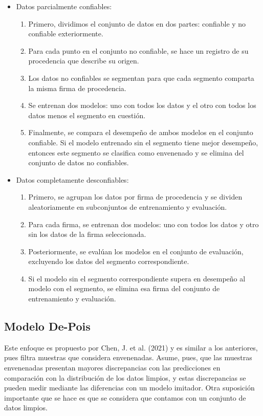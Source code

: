 \documentclass[letterpaper,12pt,oneside]{book}
\begin{document}
{{{{\begin{itemize}
    \item Datos parcialmente confiables:
    \begin{enumerate}
        \item Primero, dividimos el conjunto de datos en dos partes: confiable y no confiable exteriormente.
        \item Para cada punto en el conjunto no confiable, se hace un registro de su procedencia que describe su origen.
        \item Los datos no confiables se segmentan para que cada segmento comparta la misma firma de procedencia.
        \item Se entrenan dos modelos: uno con todos los datos y el otro con todos los datos menos el segmento en cuestión.
        \item Finalmente, se compara el desempeño de ambos modelos en el conjunto confiable. Si el modelo entrenado sin el segmento tiene mejor desempeño, entonces este segmento se clasifica como envenenado y se elimina del conjunto de datos no confiables.
    \end{enumerate}
    
    \item Datos completamente desconfiables:
    \begin{enumerate}
        \item Primero, se agrupan los datos por firma de procedencia y se dividen aleatoriamente en subconjuntos de entrenamiento y evaluación.
        \item Para cada firma, se entrenan dos modelos: uno con todos los datos y otro sin los datos de la firma seleccionada.
        \item Posteriormente, se evalúan los modelos en el conjunto de evaluación, excluyendo los datos del segmento correspondiente.
        \item Si el modelo sin el segmento correspondiente supera en desempeño al modelo con el segmento, se elimina esa firma del conjunto de entrenamiento y evaluación.
    \end{enumerate}
\end{itemize}


\subsection{Modelo De-Pois}
Este enfoque es propuesto por Chen, J. et al. (2021) y es similar a los anteriores, pues filtra muestras que considera envenenadas. Asume, pues, que las muestras envenenadas presentan mayores discrepancias con las predicciones en comparación con la distribución de los datos limpios, y estas discrepancias se pueden medir mediante las diferencias con un modelo imitador. Otra suposición importante que se hace es que se considera que contamos con un conjunto de datos limpios.  

}}}}
\end{document}
